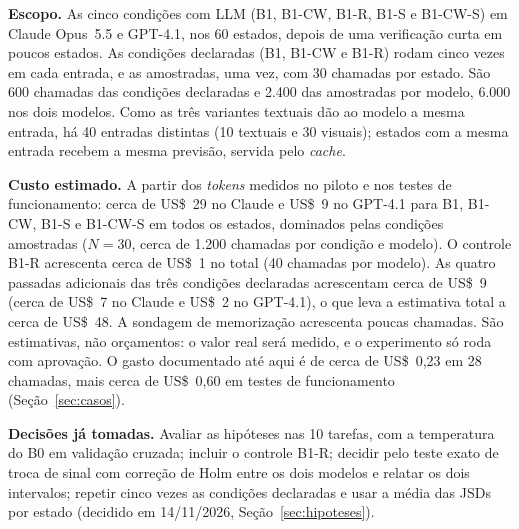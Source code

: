 \documentclass[12pt,oneside,a4paper,chapter=TITLE,english,brazil]{abntex2}
\begin{document}
\begin{planejado}
\textbf{Escopo.} As cinco condições com LLM (B1, B1-CW, B1-R, B1-S e B1-CW-S) em Claude Opus~5.5 e GPT-4.1, nos 60 estados, depois de uma verificação curta em poucos estados. As condições declaradas (B1, B1-CW e B1-R) rodam cinco vezes em cada entrada, e as amostradas, uma vez, com 30 chamadas por estado. São 600 chamadas das condições declaradas e 2.400 das amostradas por modelo, 6.000 nos dois modelos. Como as três variantes textuais dão ao modelo a mesma entrada, há 40 entradas distintas (10 textuais e 30 visuais); estados com a mesma entrada recebem a mesma previsão, servida pelo \textit{cache}.

\textbf{Custo estimado.} A partir dos \textit{tokens} medidos no piloto e nos testes de funcionamento: cerca de US\$~29 no Claude e US\$~9 no GPT-4.1 para B1, B1-CW, B1-S e B1-CW-S em todos os estados, dominados pelas condições amostradas ($N=30$, cerca de 1.200 chamadas por condição e modelo). O controle B1-R acrescenta cerca de US\$~1 no total (40 chamadas por modelo). As quatro passadas adicionais das três condições declaradas acrescentam cerca de US\$~9 (cerca de US\$~7 no Claude e US\$~2 no GPT-4.1), o que leva a estimativa total a cerca de US\$~48. A sondagem de memorização acrescenta poucas chamadas. São estimativas, não orçamentos: o valor real será medido, e o experimento só roda com aprovação. O gasto documentado até aqui é de cerca de US\$~0,23 em 28 chamadas, mais cerca de US\$~0,60 em testes de funcionamento (Seção~\ref{sec:casos}).

\textbf{Decisões já tomadas.} Avaliar as hipóteses nas 10 tarefas, com a temperatura do B0 em validação cruzada; incluir o controle B1-R; decidir pelo teste exato de troca de sinal com correção de Holm entre os dois modelos e relatar os dois intervalos; repetir cinco vezes as condições declaradas e usar a média das JSDs por estado (decidido em 14/11/2026, Seção~\ref{sec:hipoteses}).


\end{planejado}
\end{document}
